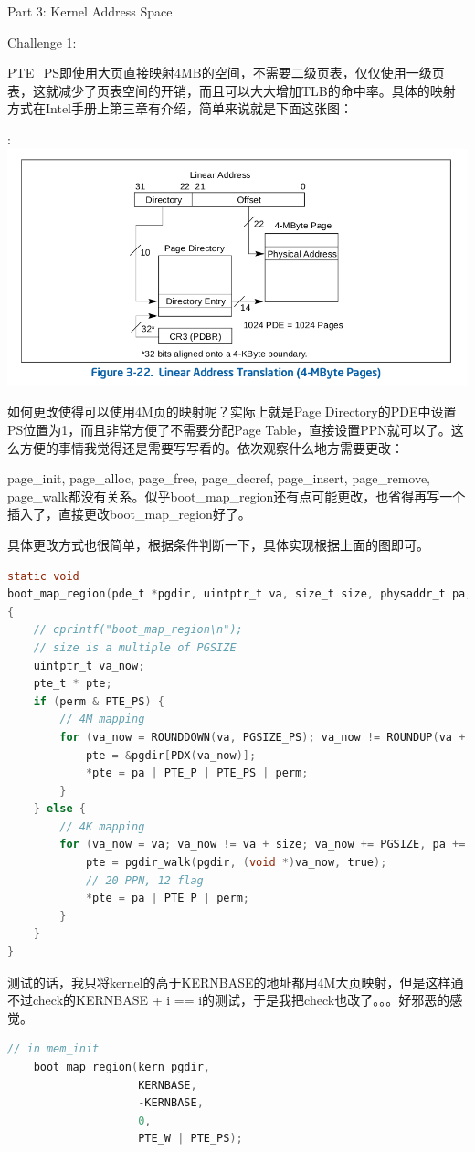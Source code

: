 \documentclass[GBK,winfonts,a4paper,10pt]{ctexart}
\begin{document}
\begin{section}{Part 3: Kernel Address Space}
\begin{subsection}{Challenge 1:}
\par
PTE\_PS即使用大页直接映射4MB的空间，不需要二级页表，仅仅使用一级页表，这就减少了页表空间的开销，而且可以大大增加TLB的命中率。具体的映射方式在Intel手册上第三章有介绍，简单来说就是下面这张图：
\par:
\includegraphics[scale=0.5]{4Mpage.png}
\par
如何更改使得可以使用4M页的映射呢？实际上就是Page Directory的PDE中设置PS位置为1，而且非常方便了不需要分配Page Table，直接设置PPN就可以了。这么方便的事情我觉得还是需要写写看的。依次观察什么地方需要更改：
\par
page\_init, page\_alloc, page\_free, page\_decref, page\_insert, page\_remove, page\_walk都没有关系。似乎boot\_map\_region还有点可能更改，也省得再写一个插入了，直接更改boot\_map\_region好了。
\par
具体更改方式也很简单，根据条件判断一下，具体实现根据上面的图即可。
\begin{lstlisting}[language=C]
static void
boot_map_region(pde_t *pgdir, uintptr_t va, size_t size, physaddr_t pa, int perm)
{
    // cprintf("boot_map_region\n");
	// size is a multiple of PGSIZE
    uintptr_t va_now;
    pte_t * pte;
    if (perm & PTE_PS) {
    	// 4M mapping
    	for (va_now = ROUNDDOWN(va, PGSIZE_PS); va_now != ROUNDUP(va + size, PGSIZE_PS); va_now += PGSIZE_PS, pa += PGSIZE_PS) {
    		pte = &pgdir[PDX(va_now)];
    		*pte = pa | PTE_P | PTE_PS | perm;
    	} 
    } else {
    	// 4K mapping
    	for (va_now = va; va_now != va + size; va_now += PGSIZE, pa += PGSIZE) {
        	pte = pgdir_walk(pgdir, (void *)va_now, true);
        	// 20 PPN, 12 flag
        	*pte = pa | PTE_P | perm;
    	}
	}
}
\end{lstlisting}
\par
测试的话，我只将kernel的高于KERNBASE的地址都用4M大页映射，但是这样通不过check的KERNBASE + i == i的测试，于是我把check也改了。。。好邪恶的感觉。
\begin{lstlisting}[language=C]
// in mem_init
    boot_map_region(kern_pgdir,
                    KERNBASE,
                    -KERNBASE,
                    0,
                    PTE_W | PTE_PS); 
                    

\end{lstlisting}
\end{subsection}
\end{section}
\end{document}

